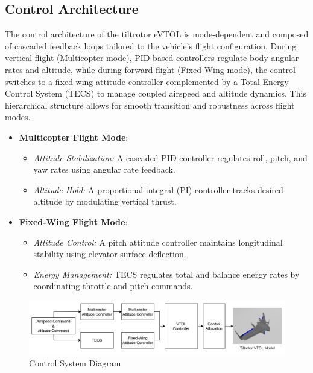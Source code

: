 \documentclass[journal,article,submit,pdftex,moreauthors]{Definitions/mdpi}
\begin{document}
\subsection{Control Architecture}
The control architecture of the tiltrotor eVTOL is mode-dependent and composed of cascaded feedback loops tailored to the vehicle’s flight configuration. During vertical flight (Multicopter mode), PID-based controllers regulate body angular rates and altitude, while during forward flight (Fixed-Wing mode), the control switches to a fixed-wing attitude controller complemented by a Total Energy Control System (TECS) to manage coupled airspeed and altitude dynamics. This hierarchical structure allows for smooth transition and robustness across flight modes.
\begin{itemize}
    \item \textbf{Multicopter Flight Mode}:
    \begin{itemize}
        \item \textit{Attitude Stabilization:} A cascaded PID controller regulates roll, pitch, and yaw rates using angular rate feedback.
        \item \textit{Altitude Hold:} A proportional-integral (PI) controller tracks desired altitude by modulating vertical thrust.
    \end{itemize}
    
    \item \textbf{Fixed-Wing Flight Mode}:
    \begin{itemize}
        \item \textit{Attitude Control:} A pitch attitude controller maintains longitudinal stability using elevator surface deflection.
        \item \textit{Energy Management:} TECS regulates total and balance energy rates by coordinating throttle and pitch commands.
    \end{itemize}
\end{itemize}
\begin{figure}[H]
    \centering
    \includegraphics[width=0.9\linewidth]{control_system_diagram.png}
    \caption{Control System Diagram}
    \label{fig:control_system_diagram}
\end{figure}
\end{document}
